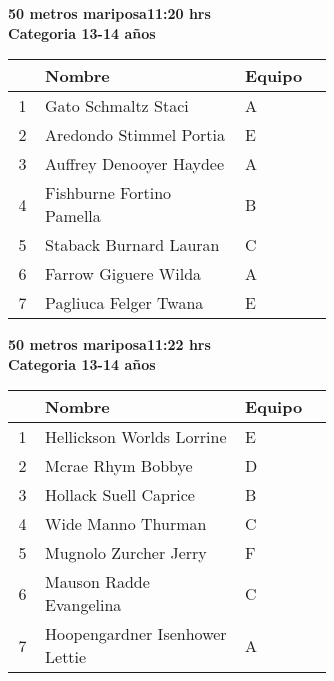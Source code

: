 \begin{minipage}{0.95\linewidth}\vspace{0.5cm} 
\begin{flushleft}
\textbf{
\hspace{-0.15cm}50 metros mariposa\hspace{1.5cm}11:20 hrs \\Categoria 13-14 años}\vspace{-0.2cm} 
\end{flushleft}
\begin{tabular}{cp{0.63\linewidth}l}
\hline
& \textbf{Nombre} & \textbf{Equipo} \\ \hline
1 & Gato Schmaltz Staci & A \\ 
2 & Aredondo Stimmel Portia & E \\ 
3 & Auffrey Denooyer Haydee & A \\ 
4 & Fishburne Fortino Pamella & B \\ 
5 & Staback Burnard Lauran & C \\ 
6 & Farrow Giguere Wilda & A \\ 
7 & Pagliuca Felger Twana & E \\ 
\end{tabular}
\end{minipage}
\begin{minipage}{0.95\linewidth}\vspace{0.5cm} 
\begin{flushleft}
\textbf{
\hspace{-0.15cm}50 metros mariposa\hspace{1.5cm}11:22 hrs \\Categoria 13-14 años}\vspace{-0.2cm} 
\end{flushleft}
\begin{tabular}{cp{0.63\linewidth}l}
\hline
& \textbf{Nombre} & \textbf{Equipo} \\ \hline
1 & Hellickson Worlds Lorrine & E \\ 
2 & Mcrae Rhym Bobbye & D \\ 
3 & Hollack Suell Caprice & B \\ 
4 & Wide Manno Thurman & C \\ 
5 & Mugnolo Zurcher Jerry & F \\ 
6 & Mauson Radde Evangelina & C \\ 
7 & Hoopengardner Isenhower Lettie & A \\ 
\end{tabular}
\end{minipage}
